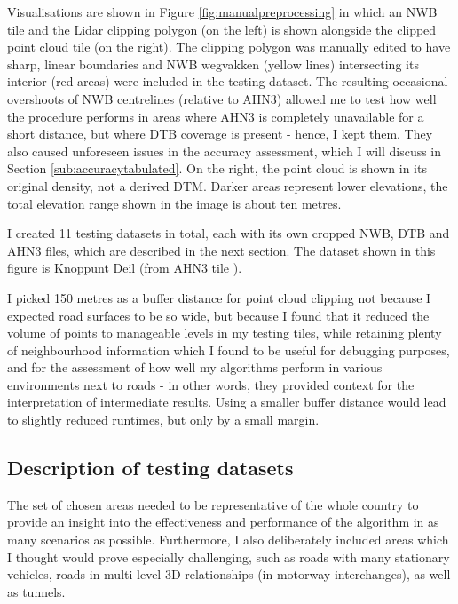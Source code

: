 Visualisations are shown in Figure \ref{fig:manualpreprocessing} in which an NWB tile and the Lidar clipping polygon (on the left) is shown alongside the clipped point cloud tile (on the right). The clipping polygon was manually edited to have sharp, linear boundaries and NWB wegvakken (yellow lines) intersecting its interior (red areas) were included in the testing dataset. The resulting occasional overshoots of NWB centrelines (relative to AHN3) allowed me to test how well the procedure performs in areas where AHN3 is completely unavailable for a short distance, but where DTB coverage is present - hence, I kept them. They also caused unforeseen issues in the accuracy assessment, which I will discuss in Section \ref{sub:accuracytabulated}. On the right, the point cloud is shown in its original density, not a derived DTM. Darker areas represent lower elevations, the total elevation range shown in the image is about ten metres.

I created 11 testing datasets in total, each with its own cropped NWB, DTB and AHN3 files, which are described in the next section. The dataset shown in this figure is Knoppunt Deil (from AHN3 tile ).

I picked 150 metres as a buffer distance for point cloud clipping not because I expected road surfaces to be so wide, but because I found that it reduced the volume of points to manageable levels in my testing tiles, while retaining plenty of neighbourhood information which I found to be useful for debugging purposes, and for the assessment of how well my algorithms perform in various environments next to roads - in other words, they provided context for the interpretation of intermediate results. Using a smaller buffer distance would lead to slightly reduced runtimes, but only by a small margin.

\subsection{Description of testing datasets}
\label{sub:testingdata}

The set of chosen areas needed to be representative of the whole country to provide an insight into the effectiveness and performance of the algorithm in as many scenarios as possible. Furthermore, I also deliberately included areas which I thought would prove especially challenging, such as roads with many stationary vehicles, roads in multi-level 3D relationships (in motorway interchanges), as well as tunnels.

